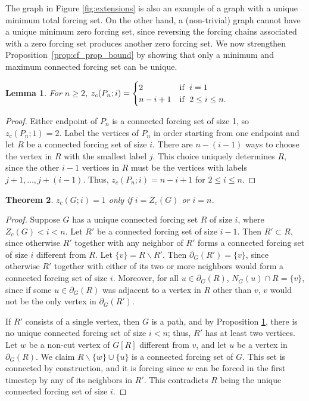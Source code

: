 \documentclass[11pt]{article}
\newtheorem{thm}{Theorem}
\newtheorem{lem}[thm]{Lemma}
\theoremstyle{definition}
\newcommand{\1}{\vspace{0.1cm}}
\newcommand{\2}{\vspace{0.2cm}}
\newcommand{\3}{\vspace{0.3cm}}
\begin{document}
The graph in Figure \ref{fig:extensions} is also an example of a graph with a unique minimum total forcing set. On the other hand, a (non-trivial) graph cannot have a unique minimum zero forcing set, since reversing the forcing chains associated with a zero forcing set produces another zero forcing set. We now strengthen Proposition~\ref{prop:cf_prop_bound} by showing that only a minimum and maximum connected forcing set can be unique.

\begin{lem}
\label{prop_path_cf_poly}
For $n\geq 2$, $z_c(P_n;i)=
\begin{cases}
2 &\text{if\; } i=1\\
n-i+1 &\text{if\; } 2\leq i\leq n.
\end{cases}$
\end{lem}
\begin{proof}
Either endpoint of $P_n$ is a connected forcing set of size 1, so $z_c(P_n;1)=2$. Label the vertices of $P_n$ in order starting from one endpoint and let $R$ be a connected forcing set of size $i$. There are $n-(i-1)$ ways to choose the vertex in $R$ with the smallest label $j$. This choice uniquely determines $R$, since the other $i-1$ vertices in $R$ must be the vertices with labels $j+1,\ldots,j+(i-1)$. Thus, $z_c(P_n;i)=n-i+1$ for $2\leq i\leq n$.
\end{proof}



\begin{thm}
$z_c(G;i)=1$ only if $i=Z_c(G)$ or $i=n$. 
\end{thm}
\begin{proof}
Suppose $G$ has a unique connected forcing set $R$ of size $i$, where $Z_c(G)<i<n$. Let $R'$ be a connected forcing set of size $i-1$. Then $R'\subset R$, since otherwise $R'$ together with any neighbor of $R'$ forms a connected forcing set of size $i$ different from $R$. Let $\{v\}=R\backslash R'$. Then $\partial_G(R')=\{v\}$, since otherwise $R'$ together with either of its two or more neighbors would form a connected forcing set of size $i$. Moreover, for all $u \in \partial_G(R)$, $N_G(u)\cap R=\{v\}$, since if some $u \in \partial_G(R)$ was adjacent to a vertex in $R$ other than $v$, $v$ would not be the only vertex in $\partial_G(R')$. 

If $R'$ consists of a single vertex, then $G$ is a path, and by Proposition \ref{prop_path_cf_poly}, there is no unique connected forcing set of size $i<n$; thus, $R'$ has at least two vertices. Let $w$ be a non-cut vertex of $G[R]$ different from $v$, and let $u$ be a vertex in $\partial_G(R)$. We claim $R\backslash\{w\}\cup \{u\}$ is a connected forcing set of $G$. This set is connected by construction, and it is forcing since $w$ can be forced in the first timestep by any of its neighbors in $R'$. This contradicts $R$ being the unique connected forcing set of size $i$.
\end{proof}
\end{document}
